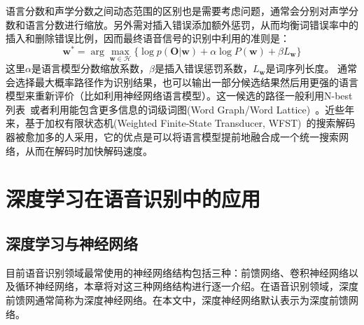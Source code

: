 语言分数和声学分数之间动态范围的区别也是需要考虑问题，通常会分别对声学分数和语言分数进行缩放。另外需对插入错误添加额外惩罚，从而均衡词错误率中的插入和删除错误比例，因而最终语音信号的识别中利用的准则是：
\begin{equation}
\mathbf{w}^* = \arg \max_{\mathbf{w} \in \mathcal{H}} \{\log p(\mathbf{O}|\mathbf{w}) + \alpha \log P(\mathbf{w}) + \beta L_{\mathbf{w}}\}
\end{equation}
这里$\alpha$是语言模型分数缩放系数，$\beta$是插入错误惩罚系数，$L_{\mathbf{w}}$是词序列长度。
通常会选择最大概率路径作为识别结果，也可以输出一部分候选结果然后用更强的语言模型来重新评价（比如利用神经网络语言模型）。这一候选的路径一般利用N-best列表~\cite{schwartz1990n}或者利用能包含更多信息的词级词图(Word Graph/Word Lattice)~\cite{ortmanns1997word}。近些年来，基于加权有限状态机(Weighted Finite-State Transducer, WFST)~\cite{mohri2002weighted}的搜索解码器被愈加多的人采用，它的优点是可以将语言模型提前地融合成一个统一搜索网络，从而在解码时加快解码速度。

\section{深度学习在语音识别中的应用}

\subsection{深度学习与神经网络}
\label{chap:intro2-dl}

目前语音识别领域最常使用的神经网络结构包括三种：前馈网络、卷积神经网络以及循环神经网络，本章将对这三种网络结构进行逐一介绍。在语音识别领域，深度前馈网通常简称为深度神经网络。在本文中，深度神经网络默认表示为深度前馈网络。

